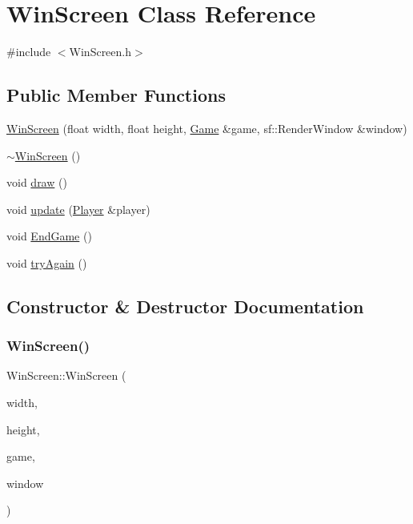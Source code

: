 \hypertarget{class_win_screen}{}\section{Win\+Screen Class Reference}
\label{class_win_screen}


{\ttfamily \#include $<$Win\+Screen.\+h$>$}

\subsection*{Public Member Functions}
\begin{DoxyCompactItemize}
\item 
\mbox{\hyperlink{class_win_screen_a0c7e60006494a806e5c14110d3eefc83}{Win\+Screen}} (float width, float height, \mbox{\hyperlink{class_game}{Game}} \&game, sf\+::\+Render\+Window \&window)
\item 
\mbox{\hyperlink{class_win_screen_aba525624740b518cf6e14cd66d79a992}{$\sim$\+Win\+Screen}} ()
\item 
void \mbox{\hyperlink{class_win_screen_a132ab3f47f674d9d5ed8764d1833f622}{draw}} ()
\item 
void \mbox{\hyperlink{class_win_screen_a5abaf2936e43ab89b4f7bb3a156ff898}{update}} (\mbox{\hyperlink{class_player}{Player}} \&player)
\item 
void \mbox{\hyperlink{class_win_screen_af2363010d372b196b5f200a803ffb9d5}{End\+Game}} ()
\item 
void \mbox{\hyperlink{class_win_screen_a38b93d4d936808d6462abb7cb68036d2}{try\+Again}} ()
\end{DoxyCompactItemize}


\subsection{Constructor \& Destructor Documentation}
\mbox{\label{class_win_screen_a0c7e60006494a806e5c14110d3eefc83}} 
\subsubsection{\texorpdfstring{WinScreen()}{WinScreen()}}
{\footnotesize\ttfamily Win\+Screen\+::\+Win\+Screen (\begin{DoxyParamCaption}\item[{float}]{width,  }\item[{float}]{height,  }\item[{\mbox{\hyperlink{class_game}{Game}} \&}]{game,  }\item[{sf\+::\+Render\+Window \&}]{window }\end{DoxyParamCaption})}

